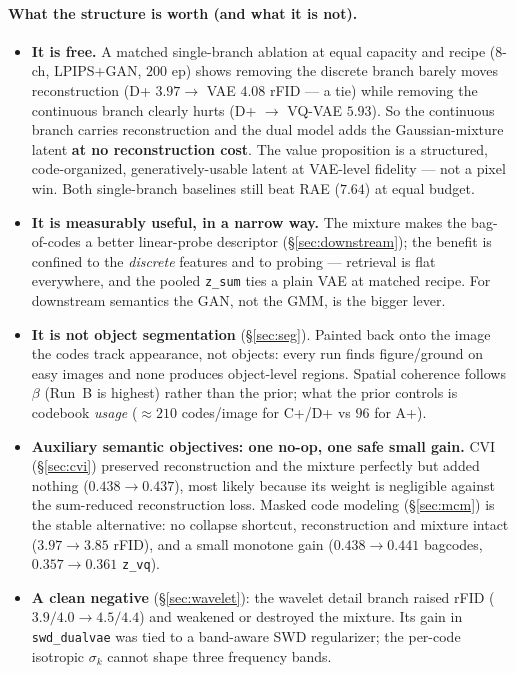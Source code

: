 \documentclass[11pt]{article}
\begin{document}
\paragraph{What the structure is worth (and what it is not).}
\begin{itemize}
  \item \textbf{It is free.} A matched single-branch ablation at equal capacity and recipe
  (8-ch, LPIPS+GAN, $200$ ep) shows removing the discrete branch barely moves reconstruction
  (D+ $3.97 \to$ VAE $4.08$ rFID --- a tie) while removing the continuous branch clearly hurts
  (D+ $\to$ VQ-VAE $5.93$). So the continuous branch carries reconstruction and the dual model adds
  the Gaussian-mixture latent \textbf{at no reconstruction cost}. The value proposition is a
  structured, code-organized, generatively-usable latent at VAE-level fidelity --- not a pixel win.
  Both single-branch baselines still beat RAE ($7.64$) at equal budget.
  \item \textbf{It is measurably useful, in a narrow way.} The mixture makes the bag-of-codes a
  better linear-probe descriptor (\S\ref{sec:downstream}); the benefit is confined to the
  \emph{discrete} features and to probing --- retrieval is flat everywhere, and the pooled
  \texttt{z\_sum} ties a plain VAE at matched recipe. For downstream semantics the GAN, not the
  GMM, is the bigger lever.
  \item \textbf{It is not object segmentation} (\S\ref{sec:seg}). Painted back onto the image the
  codes track appearance, not objects: every run finds figure/ground on easy images and none
  produces object-level regions. Spatial coherence follows $\beta$ (Run~B is highest) rather than
  the prior; what the prior controls is codebook \emph{usage} ($\approx$$210$ codes/image for
  C+/D+ vs $96$ for A+).
  \item \textbf{Auxiliary semantic objectives: one no-op, one safe small gain.} CVI
  (\S\ref{sec:cvi}) preserved reconstruction and the mixture perfectly but added nothing
  ($0.438\!\to\!0.437$), most likely because its weight is negligible against the sum-reduced
  reconstruction loss. Masked code modeling (\S\ref{sec:mcm}) is the stable alternative: no
  collapse shortcut, reconstruction and mixture intact ($3.97\!\to\!3.85$ rFID), and a small
  monotone gain ($0.438\!\to\!0.441$ bagcodes, $0.357\!\to\!0.361$ \texttt{z\_vq}).
  \item \textbf{A clean negative} (\S\ref{sec:wavelet}): the wavelet detail branch raised rFID
  ($3.9/4.0\!\to\!4.5/4.4$) and weakened or destroyed the mixture. Its gain in
  \texttt{swd\_dualvae} was tied to a band-aware SWD regularizer; the per-code isotropic
  $\sigma_k$ cannot shape three frequency bands.
\end{itemize}
\end{document}

